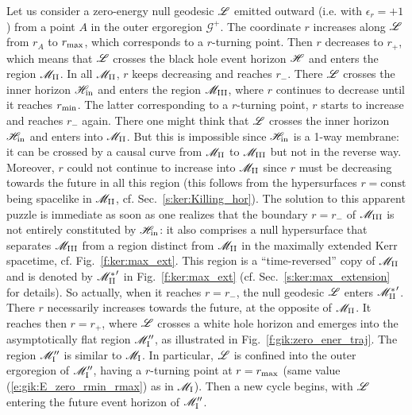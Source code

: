 Let us consider a zero-energy null geodesic $\mathscr{L}$ emitted outward (i.e.
with $\epsilon_r = +1$) from a point $A$ in the outer ergoregion $\mathscr{G}^+$.
The coordinate $r$ increases along $\mathscr{L}$ from $r_A$ to $r_{\rm max}$, which
corresponds to a $r$-turning point. Then $r$ decreases to $r_+$, which means
that $\mathscr{L}$
crosses the black hole event horizon $\mathscr{H}$ and enters the region $\mathscr{M}_{\rm II}$.
In all $\mathscr{M}_{\rm II}$, $r$ keeps decreasing and reaches $r_-$. There $\mathscr{L}$
crosses the inner horizon $\mathscr{H}_{\rm in}$ and enters the region $\mathscr{M}_{\rm III}$,
where $r$ continues to decrease until it reaches $r_{\rm min}$. The latter
corresponding to a $r$-turning point, $r$ starts to increase and reaches
$r_-$ again. There one might think that $\mathscr{L}$ crosses the inner horizon
$\mathscr{H}_{\rm in}$ and enters into $\mathscr{M}_{\rm II}$. But this is impossible since
$\mathscr{H}_{\rm in}$ is a 1-way membrane: it can be crossed by a causal curve
from $\mathscr{M}_{\rm II}$ to $\mathscr{M}_{\rm III}$ but not in the reverse way. Moreover, $r$
could not continue to increase into $\mathscr{M}_{\rm II}$ since $r$ must be decreasing
towards the future in all this region (this follows from the hypersurfaces
$r=\mathrm{const}$ being spacelike in $\mathscr{M}_{\rm II}$, cf. Sec.~\ref{s:ker:Killing_hor}).
The solution to this apparent puzzle is immediate as soon as one realizes
that the boundary $r = r_-$ of $\mathscr{M}_{\rm III}$ is not entirely constituted
by $\mathscr{H}_{\rm in}$: it also comprises a null hypersurface that separates
$\mathscr{M}_{\rm III}$ from a region distinct from $\mathscr{M}_{\rm II}$ in
the maximally extended Kerr spacetime, cf. Fig.~\ref{f:ker:max_ext}. This region
is a ``time-reversed'' copy of $\mathscr{M}_{\rm II}$ and is
denoted by ${\mathscr{M}_{\rm II}^*}'$ in Fig.~\ref{f:ker:max_ext} (cf. Sec.~\ref{s:ker:max_extension}
for details).
So actually, when it reaches $r=r_-$, the null geodesic $\mathscr{L}$ enters
${\mathscr{M}_{\rm II}^*}'$. There $r$ necessarily increases towards the future, at
the opposite of $\mathscr{M}_{\rm II}$. It reaches then $r=r_+$, where $\mathscr{L}$
crosses a white hole horizon and emerges into
the asymptotically flat region $\mathscr{M}_{\rm I}''$, as illustrated in
Fig.~\ref{f:gik:zero_ener_traj}. The region $\mathscr{M}_{\rm I}''$ is similar
to $\mathscr{M}_{\rm I}$. In particular, $\mathscr{L}$ is confined into the outer ergoregion
of $\mathscr{M}_{\rm I}''$, having a $r$-turning point at $r=r_{\rm max}$ (same value
(\ref{e:gik:E_zero_rmin_rmax}) as in $\mathscr{M}_{\rm I}$). Then a new cycle
begins, with $\mathscr{L}$ entering the future event horizon of $\mathscr{M}_{\rm I}''$.

